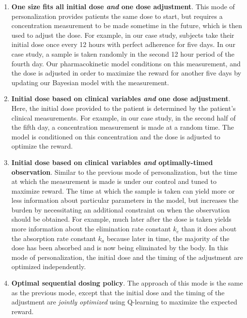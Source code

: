 \begin{enumerate}
	\item \textbf{One size fits all initial dose \textit{and} one dose adjustment}.  This mode of personalization provides patients the same dose to start, but requires a concentration measurement to be made sometime in the future, which is then used to adjust the dose.  For example, in our case study, subjects take their initial dose once every 12 hours with perfect adherence for five days. In our case study, a sample is taken randomly in the second 12 hour period of the fourth day.  Our pharmacokinetic model conditions on this measurement, and the dose is adjusted in order to maximize the reward for another five days by updating our Bayesian model with the measurement.
	
	\item \textbf{Initial dose based on clinical variables \textit{and} one dose adjustment}.  Here, the initial dose provided to the patient is determined by the patient's clinical measurements. For example, in our case study, in the second half of the fifth day, a concentration measurement is made at a random time. The model is conditioned on this concentration and the dose is adjusted to optimize the reward.
	
	\item \textbf{Initial dose based on clinical variables \textit{and} optimally-timed observation}.  Similar to the previous mode of personalization, but the time at which the measurement is made is under our control and tuned to maximize reward. The time at which the sample is taken can yield more or less information about particular parameters in the model, but increases the burden by necessitating an additional constraint on when the observation should be obtained. For example, much later after the dose is taken yields more information about the elimination rate constant $k_e$ than it does about the absorption rate constant $k_a$ because later in time, the majority of the dose has been absorbed and is now being eliminated by the body. In this mode of personalization, the initial dose and the timing of the adjustment are optimized independently. 
	
	\item \textbf{Optimal sequential dosing policy}. The approach of this mode is the same as the previous mode, except that the initial dose and the timing of the adjustment are \textit{jointly optimized} using Q-learning to maximize the expected reward.
\end{enumerate}

